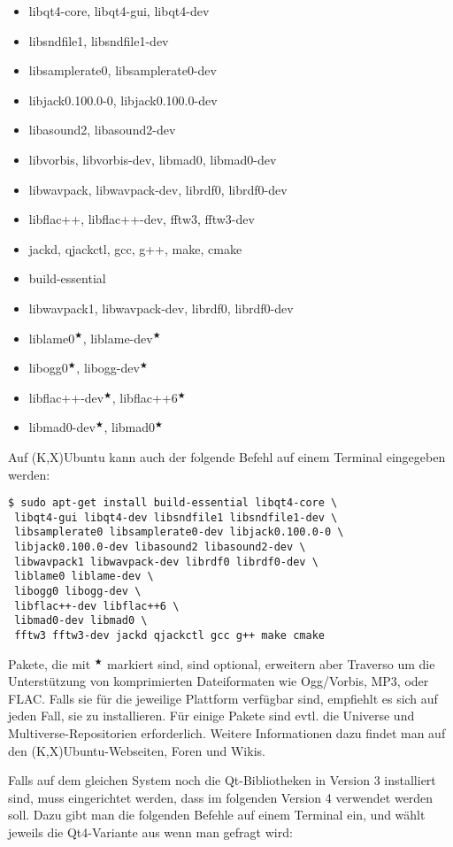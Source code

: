 \begin{itemize}
 \item libqt4-core, libqt4-gui, libqt4-dev
 \item libsndfile1, libsndfile1-dev
 \item libsamplerate0, libsamplerate0-dev
 \item libjack0.100.0-0, libjack0.100.0-dev
 \item libasound2, libasound2-dev
 \item libvorbis, libvorbis-dev, libmad0, libmad0-dev
 \item libwavpack, libwavpack-dev, librdf0, librdf0-dev
 \item libflac++, libflac++-dev, fftw3, fftw3-dev
 \item jackd, qjackctl, gcc, g++, make, cmake
 \item build-essential
 \item libwavpack1, libwavpack-dev, librdf0, librdf0-dev
 \item liblame0$^\bigstar$, liblame-dev$^\bigstar$
 \item libogg0$^\bigstar$, libogg-dev$^\bigstar$
 \item libflac++-dev$^\bigstar$, libflac++6$^\bigstar$
 \item libmad0-dev$^\bigstar$, libmad0$^\bigstar$
\end{itemize}
Auf (K,X)Ubuntu kann auch der folgende Befehl auf einem Terminal eingegeben werden:
\begin{verbatim}
$ sudo apt-get install build-essential libqt4-core \
 libqt4-gui libqt4-dev libsndfile1 libsndfile1-dev \
 libsamplerate0 libsamplerate0-dev libjack0.100.0-0 \
 libjack0.100.0-dev libasound2 libasound2-dev \
 libwavpack1 libwavpack-dev librdf0 librdf0-dev \
 liblame0 liblame-dev \
 libogg0 libogg-dev \
 libflac++-dev libflac++6 \
 libmad0-dev libmad0 \
 fftw3 fftw3-dev jackd qjackctl gcc g++ make cmake
\end{verbatim}

Pakete, die mit $^\bigstar$ markiert sind, sind optional, erweitern aber Traverso um die Unterstützung von komprimierten Dateiformaten wie Ogg/Vorbis, MP3, oder FLAC. Falls sie für die jeweilige Plattform verfügbar sind, empfiehlt es sich auf jeden Fall, sie zu installieren. Für einige Pakete sind evtl. die Universe und Multiverse-Repositorien erforderlich. Weitere Informationen dazu findet man auf den (K,X)Ubuntu-Webseiten, Foren und Wikis.

Falls auf dem gleichen System noch die Qt-Bibliotheken in Version 3 installiert sind, muss eingerichtet werden, dass im folgenden Version 4 verwendet werden soll. Dazu gibt man die folgenden Befehle auf einem Terminal ein, und wählt jeweils die Qt4-Variante aus wenn man gefragt wird:

